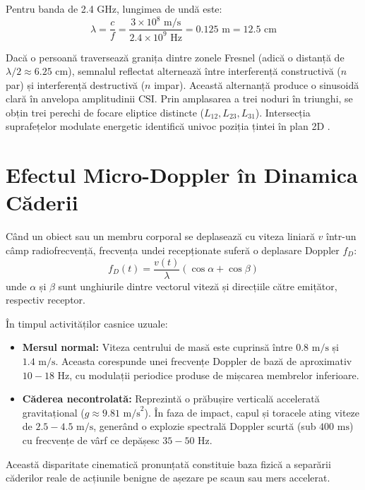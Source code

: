 Pentru banda de 2.4 GHz, lungimea de undă este:
\begin{equation}
    \lambda = \frac{c}{f} = \frac{3 \times 10^8\text{ m/s}}{2.4 \times 10^9\text{ Hz}} = 0.125\text{ m} = 12.5\text{ cm}
\end{equation}

Dacă o persoană traversează granița dintre zonele Fresnel (adică o distanță de $\lambda / 2 \approx 6.25\text{ cm}$), semnalul reflectat alternează între interferență constructivă ($n$ par) și interferență destructivă ($n$ impar). Această alternanță produce o sinusoidă clară în anvelopa amplitudinii CSI. Prin amplasarea a trei noduri în triunghi, se obțin trei perechi de focare eliptice distincte ($L_{12}, L_{23}, L_{31}$). Intersecția suprafețelor modulate energetic identifică univoc poziția țintei în plan 2D \cite{wu2017device}.

\section{Efectul Micro-Doppler în Dinamica Căderii}
Când un obiect sau un membru corporal se deplasează cu viteza liniară $v$ într-un câmp radiofrecvență, frecvența undei recepționate suferă o deplasare Doppler $f_D$:
\begin{equation}
    f_D(t) = \frac{v(t)}{\lambda} (\cos \alpha + \cos \beta)
\end{equation}
unde $\alpha$ și $\beta$ sunt unghiurile dintre vectorul viteză și direcțiile către emițător, respectiv receptor.

În timpul activităților casnice uzuale:
\begin{itemize}
    \item \textbf{Mersul normal:} Viteza centrului de masă este cuprinsă între $0.8\text{ m/s}$ și $1.4\text{ m/s}$. Aceasta corespunde unei frecvențe Doppler de bază de aproximativ $10 - 18\text{ Hz}$, cu modulații periodice produse de mișcarea membrelor inferioare.
    \item \textbf{Căderea necontrolată:} Reprezintă o prăbușire verticală accelerată gravitațional ($g \approx 9.81\text{ m/s}^2$). În faza de impact, capul și toracele ating viteze de $2.5 - 4.5\text{ m/s}$, generând o explozie spectrală Doppler scurtă (sub $400\text{ ms}$) cu frecvențe de vârf ce depășesc $35 - 50\text{ Hz}$.
\end{itemize}

Această disparitate cinematică pronunțată constituie baza fizică a separării căderilor reale de acțiunile benigne de așezare pe scaun sau mers accelerat.

